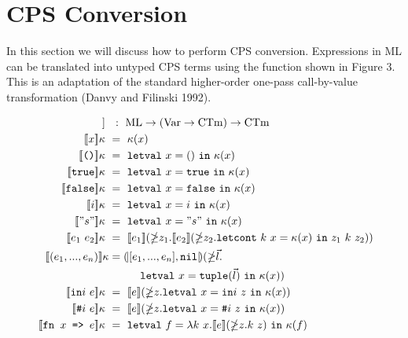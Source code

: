 \documentclass{article}
\theoremstyle{definition}
\theoremstyle{remark}
\numberwithin{equation}{section}
\begin{document}
\section{CPS Conversion}

In this section we will discuss how to perform CPS conversion.
Expressions in ML can be translated into untyped CPS
terms using the function shown in Figure 3. This is an adaptation
of the standard higher-order one-pass call-by-value transformation
(Danvy and Filinski 1992).

 \begin{figure}[!ht]
  \centering
\begin{align*}
 [\![\cdot]\!] \ &\ :\ \textrm{ML}\rightarrow(\textrm{Var}\rightarrow
    \textrm{CTm})\rightarrow \textrm{CTm}\\     %
   \env{x} \  &=\  \kappa (x)\\             %
 \env{\texttt{()}} \  &=\  \texttt{letval}\ x=()\ \texttt{in}\ \kappa (x)\\ %
\env{\texttt{true}} \  &=\  \texttt{letval}\ x=\texttt{true}\ \texttt{in}\ \kappa (x)\\ %
\env{\texttt{false}}\  &=
    \  \texttt{letval}\ x=\texttt{false}\ \texttt{in}\ \kappa (x)\\ %
 \env{i} \  &=\  \texttt{letval}\ x=i\ \texttt{in}\ \kappa (x)\\    %
 \env{"s"} \  &=\  \texttt{letval}\ x="s"\ \texttt{in}\ \kappa (x)\\    %
 \env{e_1\ e_2} \  &=\  [\![e_1]\!](\mathbb{\Lambda}z_1.[\![e_2]\!]
 (\mathbb{\Lambda}z_2.\texttt{letcont}\ k\ x=
    \kappa (x)\ \texttt{in}\ z_1\ k\ z_2))\\ %
  \env{(e_1, ... , e_n)}
        &=\round{[e_1, ... , e_n], \texttt{nil}}(\mathbb{\Lambda}\vec{l}.\\
        &\kern1cm \texttt{letval}\ x=\texttt{tuple}(\vec{l})\
        \texttt{in}\ \kappa (x))\\            %
   [\![\texttt{in}i\ e]\!]\kappa \  &=\  [\![e]\!](\mathbb{\Lambda}z.
        \texttt{letval}\ x=\texttt{in}i\ z\ \texttt{in}\ \kappa (x))\\    %
  [\![\texttt{\#}i\ e]\!]\kappa \  &=\  [\![e]\!](\mathbb{\Lambda}z.
        \texttt{letval}\ x=\texttt{\#}i\ z\ \texttt{in}\ \kappa (x))\\       %
  \env{\texttt{fn }x\texttt{ => }e}\  &=\ \texttt{letval}\ f=\lambda k\ x.[\![e]\!]
    (\mathbb{\Lambda}z.k\ z)\ \texttt{in}\ \kappa (f)\\     %

\end{align*}
\end{figure}
\end{document}
